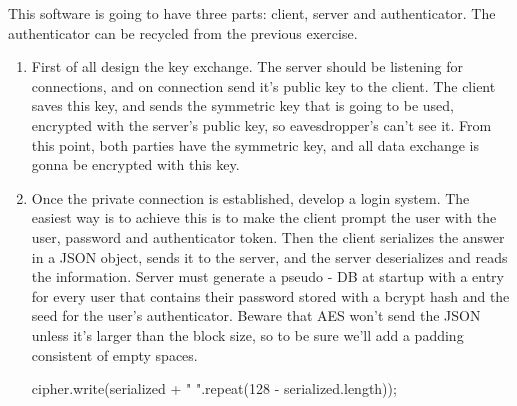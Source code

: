 \begin{Exercise}[label={proxy-auth}]
This software is going to have three parts: client, server and authenticator. The authenticator can be recycled from the previous exercise. 
\begin{enumerate}
	\item First of all design the key exchange. The server should be listening for connections, and on connection send it's public key to the client. The client saves this key, and sends the symmetric key that is going to be used, encrypted with the server's public key, so eavesdropper's can't see it. From this point, both parties have the symmetric key, and all data exchange is gonna be encrypted with this key.
	\item Once the private connection is established, develop a login system. The easiest way is to achieve this is to make the client prompt the user with the user, password and authenticator token. Then the client serializes the answer in a JSON object, sends it to the server, and the server deserializes and reads the information. Server must generate a pseudo - DB at startup with a entry for every user that contains their password stored with a bcrypt hash and the seed for the user's authenticator. Beware that AES won't send the JSON unless it's larger than the block size, so to be sure we'll add a padding consistent of empty spaces.
	\begin{js}
cipher.write(serialized + " ".repeat(128 - serialized.length));
\end{js}
\end{enumerate}

\end{Exercise}
